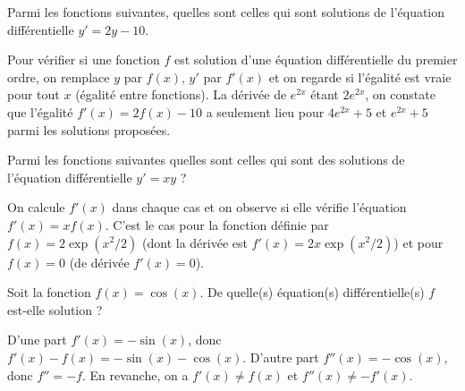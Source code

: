 \begin{question}
Parmi les fonctions suivantes, quelles sont celles qui sont solutions de l'équation différentielle \(y'=2y-10\).
\begin{answers}  
\end{answers}
\begin{explanations}
Pour vérifier si une fonction \(f\) est solution d'une équation différentielle du premier ordre, on remplace \(y\) par \(f(x)\), \(y'\) par \(f'(x)\) et on regarde si l'égalité est vraie pour tout \(x\) (égalité entre fonctions). La dérivée de \( e^{2x}\) étant \(2 e^{2x}\), on constate que l'égalité \(f'(x)= 2f(x)-10\) a seulement lieu pour \(4 e^{2x}+5\) et \(e^{2x}+5\) parmi les solutions proposées.
\end{explanations}
\end{question}


\begin{question}
Parmi les fonctions suivantes quelles sont celles qui sont des solutions de l'équation différentielle $y'=xy$ ?
\begin{answers}  
\end{answers}
\begin{explanations}
On calcule $f'(x)$ dans chaque cas et on observe si elle vérifie l'équation $f'(x) = x f(x)$.
C'est le cas pour la fonction définie par $f(x) = 2\exp(x^2/2)$ (dont la dérivée est $f'(x) = 2x\exp(x^2/2)$) et pour $f(x) = 0$ (de dérivée $f'(x)=0$).
\end{explanations}
\end{question}


\begin{question}
Soit la fonction $f(x) = \cos(x)$.
De quelle(s) équation(s) différentielle(s) $f$ est-elle solution ? 
\begin{answers}  
\end{answers}
\begin{explanations}
D'une part $f'(x) = -\sin(x)$,  donc $f'(x)-f(x) =  -\sin(x) - \cos(x)$.
D'autre part $f''(x) = -\cos(x)$, donc $f'' = -f$. En revanche, on a $f'(x) \neq f(x)$ et $f''(x) \neq -f'(x)$.
\end{explanations}
\end{question}


